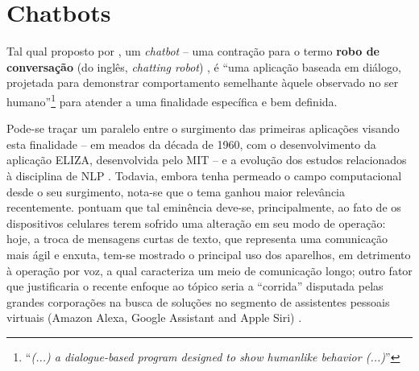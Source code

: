 \section{Chatbots}
\label{sec:chatbots}

Tal qual proposto por , um \textit{chatbot} -- uma contração para o termo \textbf{robo de conversação} (do inglês, \textit{chatting robot}) \cite{lokman2018modern}, é ``uma aplicação baseada em diálogo, projetada para demonstrar comportamento semelhante àquele observado no ser humano''\footnote{``\textit{(...) a dialogue-based program designed to show humanlike behavior (...)}''} \cite[tradução nossa]{wezel2020m} para atender a uma finalidade específica e bem definida.

Pode-se traçar um paralelo entre o surgimento das primeiras aplicações visando esta finalidade -- em meados da década de 1960, com o desenvolvimento da aplicação ELIZA, desenvolvida pelo MIT -- e a evolução dos estudos relacionados à disciplina de NLP \cite{lokman2018modern,allen1988natural}. Todavia, embora tenha permeado o campo computacional desde o seu surgimento, nota-se que o tema ganhou maior relevância recentemente.  pontuam que tal eminência deve-se, principalmente, ao fato de os dispositivos celulares terem sofrido uma alteração em seu modo de operação: hoje, a troca de mensagens curtas de texto, que representa uma comunicação mais ágil e enxuta, tem-se mostrado o principal uso dos aparelhos, em detrimento à operação por voz, a qual caracteriza um meio de comunicação longo; outro fator que justificaria o recente enfoque ao tópico seria a ``corrida''  disputada pelas grandes corporações na busca de soluções no segmento de assistentes pessoais virtuais (Amazon Alexa, Google Assistant and Apple Siri) \cite{lokman2018modern}.

